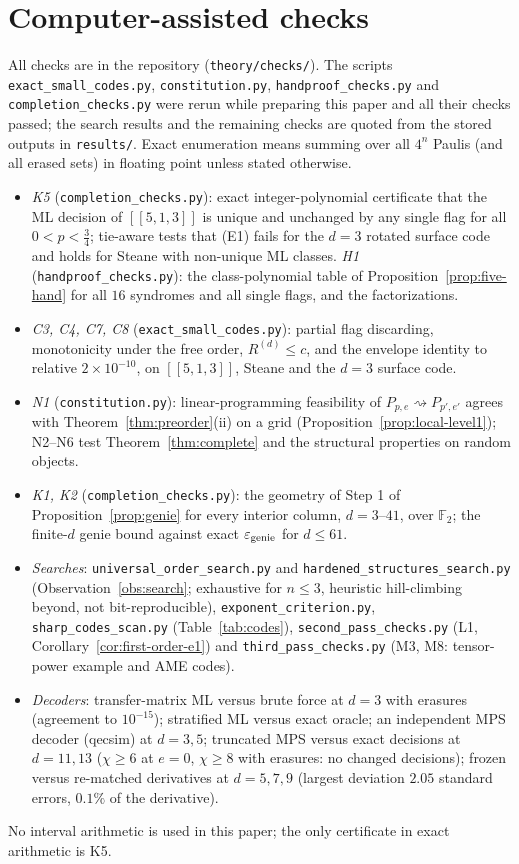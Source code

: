 \documentclass[11pt,a4paper]{article}
\theoremstyle{plain}
\theoremstyle{definition}
\theoremstyle{remark}
\newcommand{\F}{\mathbb{F}_2}
\newcommand{\red}{\rightsquigarrow}
\begin{document}
\section{Computer-assisted checks}\label{app:checks}
\sloppy

All checks are in the repository (\texttt{theory/checks/}). The scripts \texttt{exact\_small\_codes.py}, \texttt{constitution.py}, \texttt{handproof\_checks.py} and \texttt{completion\_checks.py} were rerun while preparing this paper and all their checks passed; the search results and the remaining checks are quoted from the stored outputs in \texttt{results/}. Exact enumeration means summing over all $4^n$ Paulis (and all erased sets) in floating point unless stated otherwise.
\begin{itemize}[leftmargin=1.5em]
\item \emph{K5} (\texttt{completion\_checks.py}): exact integer-polynomial certificate that the ML decision of $[[5,1,3]]$ is unique and unchanged by any single flag for all $0<p<\tfrac34$; tie-aware tests that (E1) fails for the $d=3$ rotated surface code and holds for Steane with non-unique ML classes. \emph{H1} (\texttt{handproof\_checks.py}): the class-polynomial table of Proposition~\ref{prop:five-hand} for all $16$ syndromes and all single flags, and the factorizations.
\item \emph{C3, C4, C7, C8} (\texttt{exact\_small\_codes.py}): partial flag discarding, monotonicity under the free order, $R^{(d)}\le c$, and the envelope identity to relative $2\times10^{-10}$, on $[[5,1,3]]$, Steane and the $d=3$ surface code.
\item \emph{N1} (\texttt{constitution.py}): linear-programming feasibility of $P_{p,e}\red P_{p',e'}$ agrees with Theorem~\ref{thm:preorder}(ii) on a grid (Proposition~\ref{prop:local-level1}); N2--N6 test Theorem~\ref{thm:complete} and the structural properties on random objects.
\item \emph{K1, K2} (\texttt{completion\_checks.py}): the geometry of Step 1 of Proposition~\ref{prop:genie} for every interior column, $d=3$--$41$, over $\F$; the finite-$d$ genie bound against exact $\varepsilon_{\rm genie}$ for $d\le61$.
\item \emph{Searches}: \texttt{universal\_order\_search.py} and \texttt{hardened\_structures\_search.py} (Observation~\ref{obs:search}; exhaustive for $n\le3$, heuristic hill-climbing beyond, not bit-reproducible), \texttt{exponent\_criterion.py}, \texttt{sharp\_codes\_scan.py} (Table~\ref{tab:codes}), \texttt{second\_pass\_checks.py} (L1, Corollary~\ref{cor:first-order-e1}) and \texttt{third\_pass\_checks.py} (M3, M8: tensor-power example and AME codes).
\item \emph{Decoders}: transfer-matrix ML versus brute force at $d=3$ with erasures (agreement to $10^{-15}$); stratified ML versus exact oracle; an independent MPS decoder (qecsim) at $d=3,5$; truncated MPS versus exact decisions at $d=11,13$ ($\chi\ge6$ at $e=0$, $\chi\ge8$ with erasures: no changed decisions); frozen versus re-matched derivatives at $d=5,7,9$ (largest deviation $2.05$ standard errors, $0.1\%$ of the derivative).
\end{itemize}
No interval arithmetic is used in this paper; the only certificate in exact arithmetic is K5.
\end{document}
